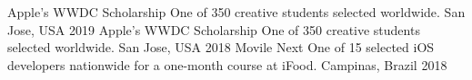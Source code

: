 \begin{cvhonors}
  \cvhonor
    {Apple's WWDC Scholarship}
    {One of 350 creative students selected worldwide.}
    {San Jose, USA}
    {2019}
  \cvhonor
    {Apple's WWDC Scholarship}
    {One of 350 creative students selected worldwide.}
    {San Jose, USA}
    {2018}
  \cvhonor
    {Movile Next}
    {One of 15 selected iOS developers nationwide for a one-month course at iFood.}
    {Campinas, Brazil}
    {2018}
\end{cvhonors}
